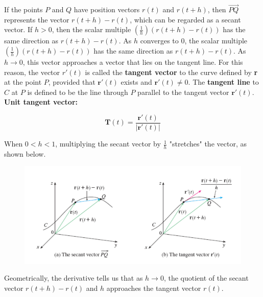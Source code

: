         If the points $P$ and $Q$ have position vectors $r(t)$ and $r(t+h)$, then $\vec{PQ}$ represents the vector $r(t+h) - r(t)$, which can be regarded as a secant vector. If $h > 0$, then the scalar multiple
        $\left(\frac{1}{h}\right)\left(r(t+h)-r(t)\right)$ has the same direction as $r(t+h)-r(t)$. As $h$ converges to 0, the scalar multiple $\left(\frac{1}{h}\right)\left(r(t+h)-r(t)\right)$ has the same direction
        as $r(t+h)-r(t)$. As $h\to 0$, this vector approaches a vector that lies on the tangent line. For this reason, the vector $r'(t)$ is called the \textbf{tangent vector} to the curve defined by \textbf{r} at the
        point $P$, provided that $\mathbf{r}'(t)$ exists and $\mathbf{r}'(t)\not = 0$. The \textbf{tangent line} to $C$ at $P$ is defined to be the line through $P$ parallel to the tangent vector $\mathbf{r}'(t)$. \\

        \textbf{Unit tangent vector:}

        \[
            \mathbf{T}(t) = \frac{\mathbf{r}'(t)}{|\mathbf{r}'(t)|}
        \]

        When $0 < h < 1$, multiplying the secant vector by $\frac{1}{h}$ "stretches" the vector, as shown below.

        \begin{figure}[hbt!]
            \centering
            \includegraphics[scale = 0.75]{Resources/13.2_Stretching}
        \end{figure}

        Geometrically, the derivative tells us that as $h \to 0$, the quotient of the secant vector $r(t+h) - r(t)$ and $h$ approaches the tangent vector $r(t)$. \\


